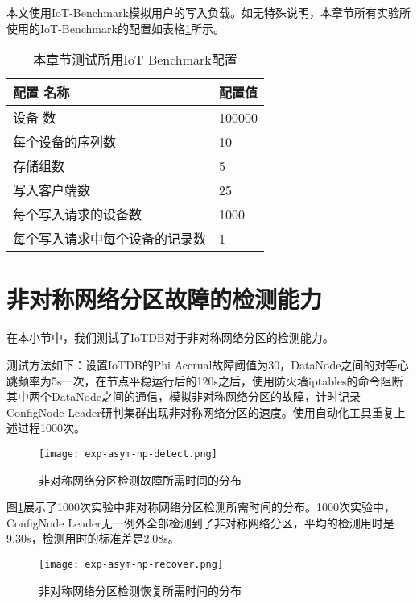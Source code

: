 本文使用IoT-Benchmark\cite{iot-benchmark}模拟用户的写入负载。如无特殊说明，本章节所有实验所使用的IoT-Benchmark的配置如表格\ref{tab:iot-benchmark-default}所示。

\begin{table}[h!]
    \centering
    \caption{本章节测试所用IoT Benchmark配置}
    \label{tab:iot-benchmark-default}
    \begin{tabular}{ll}
        \toprule
        配置 名称 & 配置值 \\
        \midrule
        设备 数 & 100000  \\
        每个设备的序列数 & 10   \\
        存储组数 & 5  \\
        写入客户端数 & 25  \\
        每个写入请求的设备数 & 1000  \\
        每个写入请求中每个设备的记录数 & 1 \\
        \bottomrule
    \end{tabular}
\end{table}


\section{非对称网络分区故障的检测能力}

在本小节中，我们测试了IoTDB对于非对称网络分区的检测能力。

测试方法如下：设置IoTDB的Phi Accrual故障阈值为30，DataNode之间的对等心跳频率为5s一次，在节点平稳运行后的120s之后，使用防火墙iptables的命令阻断其中两个DataNode之间的通信，模拟非对称网络分区的故障，计时记录ConfigNode Leader研判集群出现非对称网络分区的速度。使用自动化工具重复上述过程1000次。

\begin{figure}
    \centering
    \texttt{[image: exp-asym-np-detect.png]}
    \caption{非对称网络分区检测故障所需时间的分布}
    \label{fig:exp-asym-np-detect}
\end{figure}

图\ref{fig:exp-asym-np-detect}展示了1000次实验中非对称网络分区检测所需时间的分布。1000次实验中，ConfigNode Leader无一例外全部检测到了非对称网络分区，平均的检测用时是9.30s，检测用时的标准差是2.08s。

\begin{figure}
    \centering
    \texttt{[image: exp-asym-np-recover.png]}
    \caption{非对称网络分区检测恢复所需时间的分布}
    \label{fig:exp-asym-np-recover}
\end{figure}

